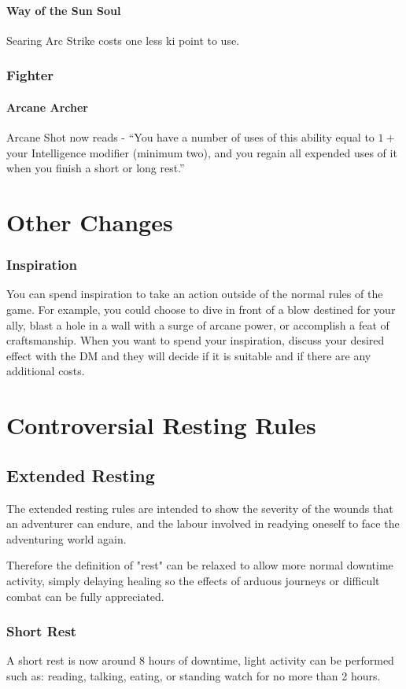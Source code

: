 \documentclass[10pt,twoside,twocolumn,nomultitoc,openany,nodeprecatedcode]{dndbook}
\begin{document}
	\subsubsection{Way of the Sun Soul}
	Searing Arc Strike costs one less ki point to use. 

	\subsection{Fighter}
	\subsubsection{Arcane Archer}
	Arcane Shot now reads - “You have a number of uses of this ability equal to $1+$ your Intelligence modifier (minimum two), and you regain all expended uses of it when you finish a short or long rest.”
	
	\chapter{Other Changes}
	\subsection{Inspiration}
	You can spend inspiration to take an action outside of the normal rules of the game. For example, you could choose to dive in front of a blow destined for your ally, blast a hole in a wall with a surge of arcane power, or accomplish a feat of craftsmanship. When you want to spend your inspiration, discuss your desired effect with the DM and they will decide if it is suitable and if there are any additional costs.
	
	\chapter{Controversial Resting Rules}
	\section{Extended Resting}
	The extended resting rules are intended to show the severity of the wounds that an adventurer can endure, and the labour involved in readying oneself to face the adventuring world again. 
	
	Therefore the definition of "rest" can be relaxed to allow more normal downtime activity, simply delaying healing so the effects of arduous journeys or difficult combat can be fully appreciated. 
	\subsection{Short Rest}
	A short rest is now around 8 hours of downtime, light activity can be performed such as: reading, talking, eating, or standing watch for no more than 2 hours.
	
\end{document}
